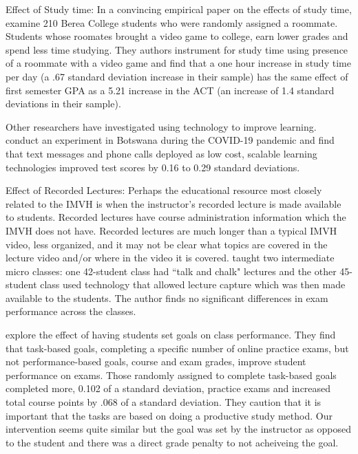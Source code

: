 \documentclass[12pt]{article}
\begin{document}
Effect of Study time: In a convincing empirical paper on the effects of study time, \textcite{ss2008} examine 210 Berea College students who were randomly assigned a roommate. Students whose roomates brought a video game to college, earn lower grades and spend less time studying. They authors instrument for study time using presence of a roommate with a video game and find that a one hour increase in study time per day (a .67 standard deviation increase in their sample) has the same effect of first semester GPA as a 5.21 increase in the ACT (an increase of 1.4 standard deviations in their sample).

Other researchers have investigated using technology to improve learning. \textcite{abbm2020} conduct an experiment in Botswana during the COVID-19 pandemic and find that text messages and phone calls deployed as low cost, scalable learning technologies improved test scores by 0.16 to 0.29 standard deviations.

Effect of Recorded Lectures: Perhaps the educational resource most closely related to the IMVH is when the instructor's recorded lecture is made available to students. Recorded lectures have course administration information which the IMVH does not have. Recorded lectures are much longer than a typical IMVH video, less organized, and it may not be clear what topics are covered in the lecture video and/or where in the video it is covered. \textcite{savage2009} taught two intermediate micro classes: one 42-student class had ``talk and chalk" lectures and the other 45-student class used technology that allowed lecture capture which was then made available to the students. The author finds no significant differences in exam performance across the classes.

\textcite{cgpr2020} explore the effect of having students set goals on class performance. They find that task-based goals, completing a specific number of online practice exams, but not performance-based goals, course and exam grades, improve student performance on exams. Those randomly assigned to complete task-based goals completed more, 0.102 of a standard deviation, practice exams and increased total course points by .068 of a standard deviation. They caution that it is important that the tasks are based on doing a productive study method. Our intervention seems quite similar but the goal was set by the instructor as opposed to the student and there was a direct grade penalty to not acheiveing the goal.
\end{document}
